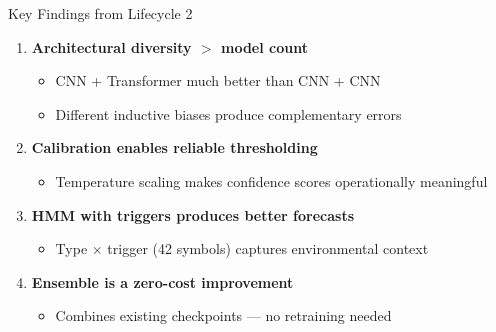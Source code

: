 \documentclass[aspectratio=169]{beamer}
\begin{document}
\begin{frame}{Key Findings from Lifecycle 2}
    \begin{enumerate}
        \item \textbf{Architectural diversity $>$ model count}
            \begin{itemize}
                \item CNN + Transformer much better than CNN + CNN
                \item Different inductive biases produce complementary errors
            \end{itemize}
        \item \textbf{Calibration enables reliable thresholding}
            \begin{itemize}
                \item Temperature scaling makes confidence scores operationally meaningful
            \end{itemize}
        \item \textbf{HMM with triggers produces better forecasts}
            \begin{itemize}
                \item Type $\times$ trigger (42 symbols) captures environmental context
            \end{itemize}
        \item \textbf{Ensemble is a zero-cost improvement}
            \begin{itemize}
                \item Combines existing checkpoints --- no retraining needed
            \end{itemize}
    \end{enumerate}
\end{frame}
\end{document}
